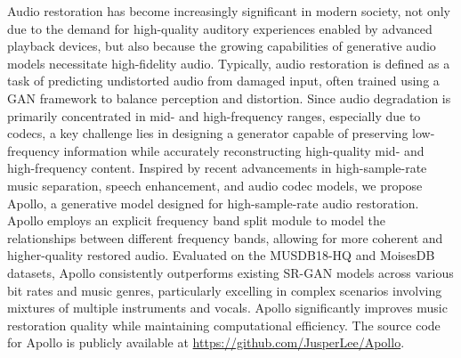 Audio restoration has become increasingly significant in modern society, not only due to the demand for high-quality auditory experiences enabled by advanced playback devices, but also because the growing capabilities of generative audio models necessitate high-fidelity audio. Typically, audio restoration is defined as a task of predicting undistorted audio from damaged input, often trained using a GAN framework to balance perception and distortion. Since audio degradation is primarily concentrated in mid- and high-frequency ranges, especially due to codecs, a key challenge lies in designing a generator capable of preserving low-frequency information while accurately reconstructing high-quality mid- and high-frequency content. Inspired by recent advancements in high-sample-rate music separation, speech enhancement, and audio codec models, we propose Apollo, a generative model designed for high-sample-rate audio restoration. Apollo employs an explicit frequency band split module to model the relationships between different frequency bands, allowing for more coherent and higher-quality restored audio. Evaluated on the MUSDB18-HQ and MoisesDB datasets, Apollo consistently outperforms existing SR-GAN models across various bit rates and music genres, particularly excelling in complex scenarios involving mixtures of multiple instruments and vocals. Apollo significantly improves music restoration quality while maintaining computational efficiency. The source code for Apollo is publicly available at \url{https://github.com/JusperLee/Apollo}.